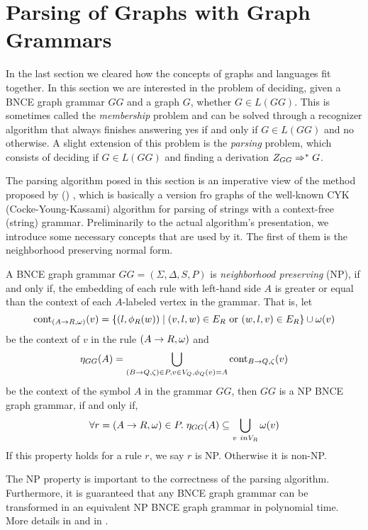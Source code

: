 \section{Parsing of Graphs with Graph Grammars}
\label{sec:parsing}
In the last section we cleared how the concepts of graphs and languages fit together. In this section we are interested in the problem of deciding, given a BNCE graph grammar $GG$ and a graph $G$, whether $G \in L(GG)$. This is sometimes called the \textit{membership} problem and can be solved through a recognizer algorithm that always finishes answering yes if and only if $G \in L(GG)$ and no otherwise. A slight extension of this problem is the \textit{parsing} problem, which consists of deciding if $G \in L(GG)$ and finding a derivation $Z_{GG} \Rightarrow^*_{} G$.


The parsing algorithm posed in this section is an imperative view of the method proposed by ()%
, which is basically a version fro graphs of the well-known CYK (Cocke-Young-Kassami) algorithm for parsing of strings with a context-free (string) grammar. Preliminarily to the actual algorithm's presentation, we introduce some necessary concepts that are used by it. The first of them is the neighborhood preserving normal form.

\begin{definition}
	\label{def:np}
	A BNCE graph grammar $GG = (\Sigma, \Delta, S, P)$ is \emph{neighborhood preserving} (NP), if and only if, the embedding of each rule with left-hand side $A$ is greater or equal than the context of each $A$-labeled vertex in the grammar. That is, let 
	\[\operatorname{cont}_{(A \to R,\omega)}(v) =\{(l,\phi_{R}(w)) \; | \; (v,l,w) \in E_R \text { or } (w,l,v) \in E_R \} \cup \omega(v) \]
	be the context of $v$ in the rule $(A \to R,\omega)$ and
	\[\eta_{GG}(A) = \bigcup_{(B \to Q,\zeta) \in P, v \in V_Q, \phi_Q(v) = A} \operatorname{cont}_{B \to Q,\zeta}(v) \] 
	be the context of the symbol $A$ in the grammar $GG$, then $GG$ is a NP BNCE graph grammar, if and only if,
	\[ \forall r = (A \to R,\omega) \in P . \; \eta_{GG}(A) \subseteq \bigcup_{v \ in V_R} \omega(v) \]
	If this property holds for a rule $r$, we say $r$ is NP. Otherwise it is non-NP.
\end{definition}

The NP property is important to the correctness of the parsing algorithm. Furthermore, it is guaranteed that any BNCE graph grammar can be transformed in an equivalent NP BNCE graph grammar in polynomial time. More details in \cite{rozenberg1986boundary} and in \cite{skodinis1998neighborhood}.

